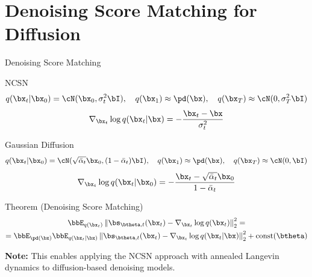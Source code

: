 \documentclass{beamer}
\begin{document}
\section{Denoising Score Matching for Diffusion}
\begin{frame}{Denoising Score Matching}
	\begin{block}{NCSN} 
		\vspace{-0.7cm} 
		\[
			q(\bx_t | \bx_0) = \cN(\bx_0, \sigma_t^2 \bI), \quad q(\bx_1) \approx \pd(\bx), \quad q(\bx_T) \approx \cN(0, \sigma_T^2 \bI)
		\]
		\[
			\nabla_{\bx_t} \log q(\bx_t | \bx) = - \frac{\bx_t - \bx}{\sigma_t^2}
		\]
		\vspace{-0.6cm} 
	\end{block}
    \eqpause
	\begin{block}{Gaussian Diffusion}
		\vspace{-0.7cm} 
		\[
			q(\bx_t | \bx_0) = \cN(\sqrt{\bar{\alpha}_t} \bx_0, (1 - \bar{\alpha}_t) \bI), \quad q(\bx_1) \approx \pd(\bx), \quad q(\bx_T) \approx \cN(0, \bI)
		\]
		\[
			\nabla_{\bx_t} \log q(\bx_t | \bx_0) = - \frac{\bx_t - \sqrt{\bar{\alpha}_t} \bx_0}{1 - \bar{\alpha}_t}
		\]
		\vspace{-0.6cm} 
	\end{block}
    \eqpause
	\begin{block}{Theorem (Denoising Score Matching)}
		\vspace{-0.7cm}
		\begin{multline*}
			\bbE_{q(\bx_t)}\left\| \bs_{\btheta, t}(\bx_t) - \nabla_{\bx_t} \log q(\bx_t) \right\|_2^2 = \\
			= \bbE_{\pd(\bx)} \bbE_{q(\bx_t | \bx)}\left\| \bs_{\btheta, t}(\bx_t) - \nabla_{\bx_t} \log q(\bx_t | \bx) \right\|_2^2 + \text{const}(\btheta)
		\end{multline*}
		\vspace{-0.5cm}
	\end{block}
    \eqpause
	\textbf{Note:} This enables applying the NCSN approach with annealed Langevin dynamics to diffusion-based denoising models.
\end{frame}
\end{document}
